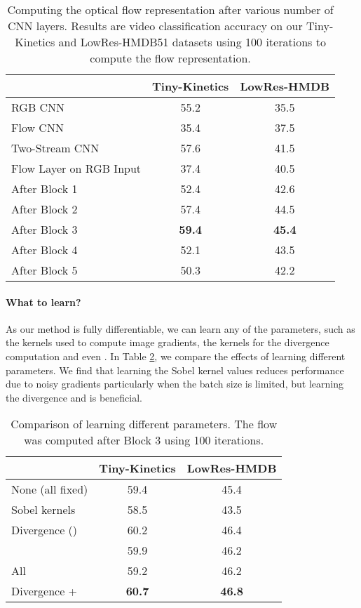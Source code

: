 \documentclass[10pt,twocolumn,letterpaper]{article}
\begin{document}
\begin{table}
  \caption{Computing the optical flow representation after various number of CNN layers. Results are video classification accuracy on our Tiny-Kinetics and LowRes-HMDB51 datasets using 100 iterations to compute the flow representation.}
  \small
  \label{tab:where}
  \centering
  \begin{tabular}{lcc}
    \toprule
         &  Tiny-Kinetics & LowRes-HMDB \\
    \midrule
    RGB CNN         & 55.2  & 35.5 \\
    Flow CNN        & 35.4  & 37.5 \\
    Two-Stream CNN  & 57.6  & 41.5 \\
    Flow Layer on RGB Input     & 37.4  & 40.5   \\
    After Block 1   & 52.4  & 42.6   \\
    After Block 2   & 57.4  & 44.5   \\
    After Block 3   & {\bf 59.4}  & {\bf 45.4}   \\
    After Block 4   & 52.1  & 43.5   \\
    After Block 5   & 50.3  & 42.2   \\
    \bottomrule
  \end{tabular}
\end{table}

\vspace{-3pt}
\paragraph{What to learn?} As our method is fully differentiable, we can learn any of the parameters, such as the kernels used to compute image gradients, the kernels for the divergence computation and even .  In Table \ref{tab:learn}, we compare the effects of learning different parameters. We find that learning the Sobel kernel values reduces performance due to noisy gradients particularly when the batch size is limited, but learning the divergence and  is beneficial.

\begin{table}
  \caption{Comparison of learning different parameters. The flow was computed after Block 3 using 100 iterations.}
  \label{tab:learn}
  \centering
  \begin{tabular}{lcc}
    \toprule
                                     &  Tiny-Kinetics & LowRes-HMDB \\
    \midrule
    None (all fixed)                   & 59.4  & 45.4   \\
    Sobel kernels                      & 58.5  & 43.5 \\
    Divergence ()                 & 60.2  &  46.4 \\
                  & 59.9  & 46.2 \\
    All                                & 59.2  & 46.2  \\
    Divergence +    & {\bf 60.7}  & {\bf 46.8} \\
    \bottomrule
  \end{tabular}
\end{table}
\end{document}
